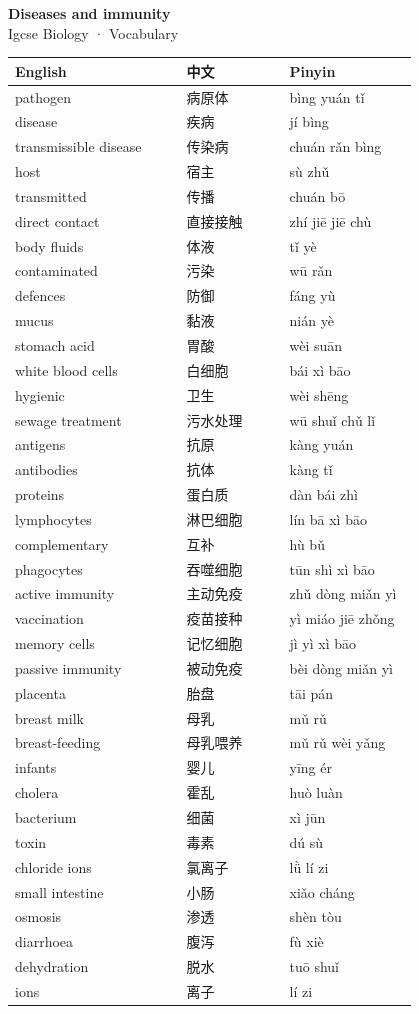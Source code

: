 \documentclass[11pt]{article}
\begin{document}
\begin{center}
  {\LARGE\bfseries Diseases and immunity}\\[0.35em]
  {\large Igcse Biology · Vocabulary}
\end{center}
\vspace{0.6em}

\begin{longtable}{@{}p{0.40\linewidth}p{0.24\linewidth}p{0.30\linewidth}@{}}
\toprule
\textbf{English} & \textbf{中文} & \textbf{Pinyin} \\
\midrule
\endhead
\bottomrule
\endlastfoot
pathogen & 病原体 & bìng yuán tǐ \\
disease & 疾病 & jí bìng \\
transmissible disease & 传染病 & chuán rǎn bìng \\
host & 宿主 & sù zhǔ \\
transmitted & 传播 & chuán bō \\
direct contact & 直接接触 & zhí jiē jiē chù \\
body fluids & 体液 & tǐ yè \\
contaminated & 污染 & wū rǎn \\
defences & 防御 & fáng yù \\
mucus & 黏液 & nián yè \\
stomach acid & 胃酸 & wèi suān \\
white blood cells & 白细胞 & bái xì bāo \\
hygienic & 卫生 & wèi shēng \\
sewage treatment & 污水处理 & wū shuǐ chǔ lǐ \\
antigens & 抗原 & kàng yuán \\
antibodies & 抗体 & kàng tǐ \\
proteins & 蛋白质 & dàn bái zhì \\
lymphocytes & 淋巴细胞 & lín bā xì bāo \\
complementary & 互补 & hù bǔ \\
phagocytes & 吞噬细胞 & tūn shì xì bāo \\
active immunity & 主动免疫 & zhǔ dòng miǎn yì \\
vaccination & 疫苗接种 & yì miáo jiē zhǒng \\
memory cells & 记忆细胞 & jì yì xì bāo \\
passive immunity & 被动免疫 & bèi dòng miǎn yì \\
placenta & 胎盘 & tāi pán \\
breast milk & 母乳 & mǔ rǔ \\
breast-feeding & 母乳喂养 & mǔ rǔ wèi yǎng \\
infants & 婴儿 & yīng ér \\
cholera & 霍乱 & huò luàn \\
bacterium & 细菌 & xì jūn \\
toxin & 毒素 & dú sù \\
chloride ions & 氯离子 & lǜ lí zi \\
small intestine & 小肠 & xiǎo cháng \\
osmosis & 渗透 & shèn tòu \\
diarrhoea & 腹泻 & fù xiè \\
dehydration & 脱水 & tuō shuǐ \\
ions & 离子 & lí zi \\
\end{longtable}
\end{document}
